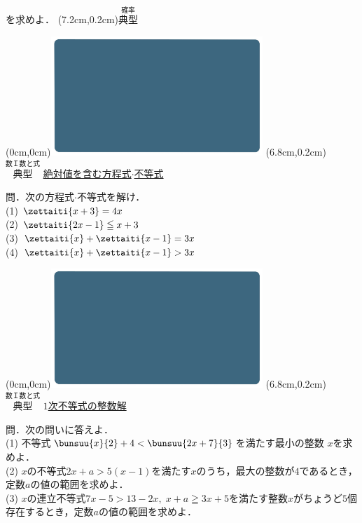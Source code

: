 \documentclass[10pt,
fleqn,
dvipdfmx,
uplatex
]{jsarticle}
\begin{document}
\large
\vspace{0.2zw}
\hfill を求めよ．
\at(7.2cm,0.2cm){\small\color{bradorange}$\overset{\text{確率}}{\text{典型}}$}



\newpage



\at(0cm,0cm){\includegraphics[width=8cm,bb=0 0 1920 1080]{./youtube/thumbnails/templates/smart_background/数I数と式.jpeg}}
\at(6.8cm,0.2cm){\small\color{bradorange}$\overset{\text{数Ｉ数と式}}{\text{典型}}$}
{\color{orange}\Large\underline{絶対値を含む方程式$\cdot$不等式}}\vspace{0.3zw}

\normalsize 
問．次の方程式$\cdot$不等式を解け．\\
(1)  $\zettaiti{x+3}=4x$\\
(2)  $\zettaiti{2x-1}\leqq x+3$\\
(3)  $\zettaiti{x}+\zettaiti{x-1}=3x$\\
(4)  $\zettaiti{x}+\zettaiti{x-1}>3x$\\



\newpage



\at(0cm,0cm){\includegraphics[width=8cm,bb=0 0 1920 1080]{./youtube/thumbnails/templates/smart_background/数I数と式.jpeg}}
\at(6.8cm,0.2cm){\small\color{bradorange}$\overset{\text{数Ｉ数と式}}{\text{典型}}$}
{\color{orange}\huge\underline{$1$次不等式の整数解}}\vspace{0.3zw}

\scriptsize 
問．次の問いに答えよ．\\
(1)  不等式$\bunsuu{x}{2}+4<\bunsuu{{2x+7}}{3}$を満たす最小の整数
$x$を求めよ．\\
(2)  $x$の不等式$2x+a>5\left(x-1\right)$を満たす$x$のうち，最大の整数が$4$であるとき，定数$a$の値の範囲を求めよ．\\
(3)  $x$の連立不等式$7x-5>{13}-2x,\;x+a\geqq 3x+5$を満たす整数$x$がちょうど$5$個存在するとき，定数$a$の値の範囲を求めよ．\\
\end{document}
